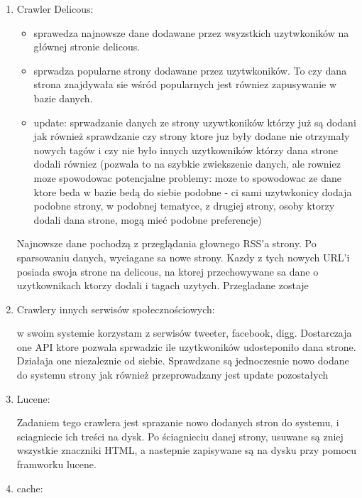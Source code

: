 \begin{enumerate}
\item Crawler Delicous:

\begin{itemize}
\item sprawedza najnowsze dane dodawane przez wsyzstkich uzytwkoników na głównej stronie delicous.
\item sprwadza popularne strony dodawane przez uzytwkoników. To czy dana strona znajdywała sie wśród popularnych jest równiez zapusywanie w bazie danych.
\item update: sprwadzanie danych ze strony uzywtkoników którzy już są dodani jak również sprawdzanie czy strony ktore juz były dodane nie otrzymały nowych tagów i czy nie było innych uzytkowników którzy dana strone dodali równiez (pozwala to na szybkie zwiekszenie danych, ale rowniez moze spowodowac potencjalne problemy: moze to spowodowac ze dane ktore beda w bazie bedą do siebie podobne - ci sami uzytwkonicy dodaja podobne strony, w podobnej tematyce, z drugiej strony,  osoby ktorzy dodali dana strone, mogą mieć podobne preferencje)
\end{itemize}

Najnowsze dane pochodzą z przeglądania głownego RSS’a strony. Po sparsowaniu danych, wyciagane sa nowe strony. Kazdy z tych nowych URL’i posiada swoja strone na delicous, na ktorej przechowywane sa dane o uzytkownikach ktorzy dodali i tagach uzytych. Przegladane zostaje



\item Crawlery innych serwisów społecznościowych:

w swoim systemie korzystam z serwisów tweeter, facebook, digg. Dostarczaja one API ktore pozwala sprwadzic ile uzytkwoników udosteponiło dana strone. Działaja one niezaleznie od siebie. Sprawdzane są jednoczesnie nowo dodane do systemu strony jak również przeprowadzany jest update pozostałych

\item Lucene:

Zadaniem tego crawlera jest sprazanie nowo dodanych stron do systemu, i sciagniecie ich treści na dysk. Po ściagnieciu danej strony, usuwane są zniej wszystkie znaczniki HTML, a nastepnie zapisywane są na dysku przy pomocu framworku lucene.

\item cache:


\end{enumerate}

